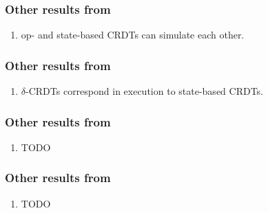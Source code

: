 \documentclass[aspectratio=169,compress]{beamer}
\newcommand{\dcrdt}{\text{$\delta$-CRDT}}
\begin{document}
  \begin{frame}
    \frametitle{Other results from~\cite{shapiro11}}
    \begin{enumerate}
      \item op- and state-based CRDTs can simulate each other.
    \end{enumerate}
  \end{frame}

  \begin{frame}
    \frametitle{Other results from~\cite{almeida16}}
    \begin{enumerate}
      \item $\delta$-CRDTs correspond in execution to state-based CRDTs.
    \end{enumerate}
  \end{frame}

  \begin{frame}
    \frametitle{Other results from~\cite{gomes17}}
    \begin{enumerate}
      \item TODO
    \end{enumerate}
  \end{frame}

  \begin{frame}
    \frametitle{Other results from~\cite{zeller14}}
    \begin{enumerate}
      \item TODO
    \end{enumerate}
  \end{frame}

  \begin{frame}
    \printbibliography
  \end{frame}
\end{document}
